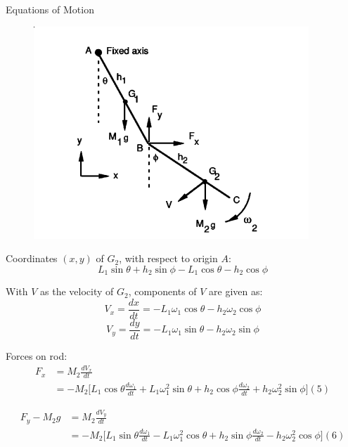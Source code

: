 \documentclass[tikz]{beamer}
\begin{document}
\begin{frame} {Equations of Motion}

	 {
		\begin{figure}
			\centering
			\includegraphics[scale=0.75]{equationsofmotion.png}
		\end{figure}
	}
	
	 {
		Coordinates $(x,y)$ of $G_2$, with respect to origin $A$:
		\begin{equation}
			L_1 \sin{\theta} + h_2 \sin{\phi} - L_1 \cos{\theta} - h_2 \cos{\phi} \tag{2}
		\end{equation}
		
		With $V$ as the velocity of $G_2$, components of $V$ are given as:
		\begin{equation}
			V_x = \frac{dx}{dt} = -L_1 \omega_1 \cos{\theta} - h_2 \omega_2 \cos{\phi} \tag{3}
		\end{equation}
		\begin{equation}
			V_y = \frac{dy}{dt} = -L_1 \omega_1 \sin{\theta} - h_2 \omega_2 \sin{\phi} \tag{4}
		\end{equation}
	}

	 {
		Forces on rod:
		\begin{equation*}
			\begin{aligned}
				F_x & = M_2 \frac{d V_x}{dt} \\
				    & = -M_2 \bigg [ L_1 \cos{\theta} \frac{d \omega_1}{dt} + L_1 \omega_1^2 \sin{\theta} + h_2 \cos{\phi} \frac{d \omega_2}{dt} + h_2 \omega_2^2 \sin{\phi} \bigg ] (5)
			\end{aligned}
		\end{equation*}

		\begin{equation*}
			\begin{aligned}
				F_y - M_2 g & = M_2 \frac{d V_y}{dt}\\
				   & = -M_2 \bigg [ L_1 \sin{\theta} \frac{d \omega_1}{dt} - L_1 \omega_1^2 \cos{\theta} + h_2 \sin{\phi} \frac{d \omega_2}{dt} - h_2 \omega_2^2 \cos{\phi} \bigg ] (6)
			\end{aligned}
		\end{equation*}
	}


\end{frame}
\end{document}
